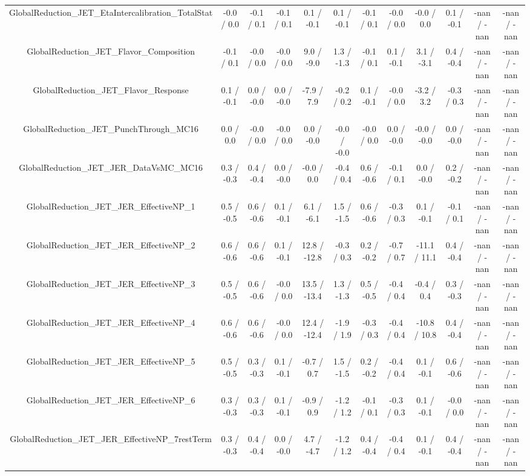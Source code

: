 \begin{table}[htbp]
\begin{center}
\begin{tabular}{|c|c|c|c|c|c|c|c|c|c|c|c|}
  GlobalReduction_JET_EtaIntercalibration_TotalStat & -0.0 / 0.0 & -0.1 / 0.1 & -0.1 / 0.1 & 0.1 / -0.1 & 0.1 / -0.1 & -0.1 / 0.1 & -0.0 / 0.0 & -0.0 / 0.0 & 0.1 / -0.1 & -nan / -nan & -nan / -nan \\ 
  GlobalReduction_JET_Flavor_Composition & -0.1 / 0.1 & -0.0 / 0.0 & -0.0 / 0.0 & 9.0 / -9.0 & 1.3 / -1.3 & -0.1 / 0.1 & 0.1 / -0.1 & 3.1 / -3.1 & 0.4 / -0.4 & -nan / -nan & -nan / -nan \\ 
  GlobalReduction_JET_Flavor_Response & 0.1 / -0.1 & 0.0 / -0.0 & 0.0 / -0.0 & -7.9 / 7.9 & -0.2 / 0.2 & 0.1 / -0.1 & -0.0 / 0.0 & -3.2 / 3.2 & -0.3 / 0.3 & -nan / -nan & -nan / -nan \\ 
  GlobalReduction_JET_PunchThrough_MC16 & 0.0 / 0.0 & -0.0 / 0.0 & -0.0 / 0.0 & 0.0 / -0.0 & -0.0 / -0.0 & -0.0 / 0.0 & 0.0 / -0.0 & -0.0 / -0.0 & 0.0 / -0.0 & -nan / -nan & -nan / -nan \\ 
  GlobalReduction_JET_JER_DataVsMC_MC16 & 0.3 / -0.3 & 0.4 / -0.4 & 0.0 / -0.0 & -0.0 / 0.0 & -0.4 / 0.4 & 0.6 / -0.6 & -0.1 / 0.1 & 0.0 / -0.0 & 0.2 / -0.2 & -nan / -nan & -nan / -nan \\ 
  GlobalReduction_JET_JER_EffectiveNP_1 & 0.5 / -0.5 & 0.6 / -0.6 & 0.1 / -0.1 & 6.1 / -6.1 & 1.5 / -1.5 & 0.6 / -0.6 & -0.3 / 0.3 & 0.1 / -0.1 & -0.1 / 0.1 & -nan / -nan & -nan / -nan \\ 
  GlobalReduction_JET_JER_EffectiveNP_2 & 0.6 / -0.6 & 0.6 / -0.6 & 0.1 / -0.1 & 12.8 / -12.8 & -0.3 / 0.3 & 0.2 / -0.2 & -0.7 / 0.7 & -11.1 / 11.1 & 0.4 / -0.4 & -nan / -nan & -nan / -nan \\ 
  GlobalReduction_JET_JER_EffectiveNP_3 & 0.5 / -0.5 & 0.6 / -0.6 & -0.0 / 0.0 & 13.5 / -13.4 & 1.3 / -1.3 & 0.5 / -0.5 & -0.4 / 0.4 & -0.4 / 0.4 & 0.3 / -0.3 & -nan / -nan & -nan / -nan \\ 
  GlobalReduction_JET_JER_EffectiveNP_4 & 0.6 / -0.6 & 0.6 / -0.6 & -0.0 / 0.0 & 12.4 / -12.4 & -1.9 / 1.9 & -0.3 / 0.3 & -0.4 / 0.4 & -10.8 / 10.8 & 0.4 / -0.4 & -nan / -nan & -nan / -nan \\ 
  GlobalReduction_JET_JER_EffectiveNP_5 & 0.5 / -0.5 & 0.3 / -0.3 & 0.1 / -0.1 & -0.7 / 0.7 & 1.5 / -1.5 & 0.2 / -0.2 & -0.4 / 0.4 & 0.1 / -0.1 & 0.6 / -0.6 & -nan / -nan & -nan / -nan \\ 
  GlobalReduction_JET_JER_EffectiveNP_6 & 0.3 / -0.3 & 0.3 / -0.3 & 0.1 / -0.1 & -0.9 / 0.9 & -1.2 / 1.2 & -0.1 / 0.1 & -0.3 / 0.3 & 0.1 / -0.1 & -0.0 / 0.0 & -nan / -nan & -nan / -nan \\ 
  GlobalReduction_JET_JER_EffectiveNP_7restTerm & 0.3 / -0.3 & 0.4 / -0.4 & 0.0 / -0.0 & 4.7 / -4.7 & -1.2 / 1.2 & 0.4 / -0.4 & -0.4 / 0.4 & 0.1 / -0.1 & 0.4 / -0.4 & -nan / -nan & -nan / -nan \\ 

\end{tabular}
\end{center}
\end{table}
